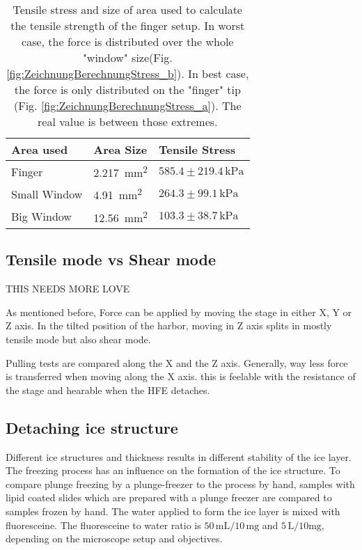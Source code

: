 \begin{table}[hbt!]
	\centering
	\begin{tabular}{|l|l|l|}
		\hline
		Area used & Area Size & Tensile Stress\\
		\hline
		\hline
		Finger & \SI{2.217}{\milli\meter\squared} & $585.4\pm219.4\,\si{\kilo\pascal}$ \\ 
		\hline
		Small Window & \SI{4.91}{\milli\meter\squared} & $264.3\pm99.1\,\si{\kilo\pascal}$ \\ 
		\hline
		Big Window & \SI{12.56}{\milli\meter\squared} & $103.3\pm38.7\,\si{\kilo\pascal}$ \\ 
		\hline
	\end{tabular}
	\caption{Tensile stress and size of area used to calculate the tensile strength of the finger setup. In worst case, the force is distributed over the whole "window" size(Fig. \ref{fig:ZeichnungBerechnungStress_b}). In best case, the force is only distributed on the "finger" tip (Fig. \ref{fig:ZeichnungBerechnungStress_a}). The real value is between those extremes.}
	\label{table:VerschAbschätzungenStressFinger}
\end{table}

\FloatBarrier

\subsection{Tensile mode vs Shear mode}

THIS NEEDS MORE LOVE

As mentioned before, Force can be applied by moving the stage in either X, Y or Z axis. In the tilted position of the harbor, moving in Z axis splits in mostly tensile mode but also shear mode.

Pulling tests are compared along the X and the Z axis. Generally, way less force is transferred when moving along the X axis. this is feelable with the resistance of the stage and hearable when the HFE detaches. 

\subsection{Detaching ice structure}

Different ice structures and thickness results in different stability of the ice layer. The freezing process has an influence on the formation of the ice structure. To compare plunge freezing by a plunge-freezer to the process by hand, samples with lipid coated slides which are prepared with a plunge freezer are compared to samples frozen by hand. The water applied to form the ice layer is mixed with fluoresceine. The fluoresceine to water ratio is $50\,\si{\milli\liter}/10\,\si{\milli\gram}$ and $5\,\si{\liter}/10\si{\milli\gram}$, depending on the microscope setup and objectives.

